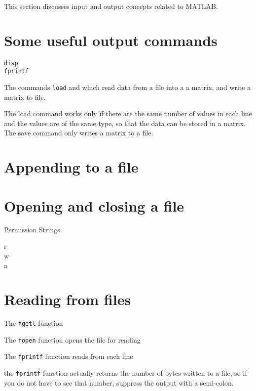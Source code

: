 This section discusses input and output concepts related to MATLAB.

\section{Some useful output commands}

\begin{description}
\item[\texttt{disp}]
\item[\texttt{fprintf}]
\end{description}
The commands \texttt{load} and  which read data from a file into a
a matrix, and write a matrix to file.

The load command works only if there are the same number of values in each line and the
values are of the same type, so that the data can be stored in a matrix. The save command only writes a matrix to a file.

\section{Appending to a file}

\section{Opening and closing a file}

Permission Strings
\begin{description}
\item[r]
\item[w]
\item[a]
\end{description}



\section{Reading from files}
The \texttt{fgetl} function

The \texttt{fopen} function opens the file for reading

The \texttt{fprintf} function  reads from each line




the \texttt{fprintf} function actually returns the number of bytes written to a file, so if you do not have to see that number, suppress the output with a semi-colon.


